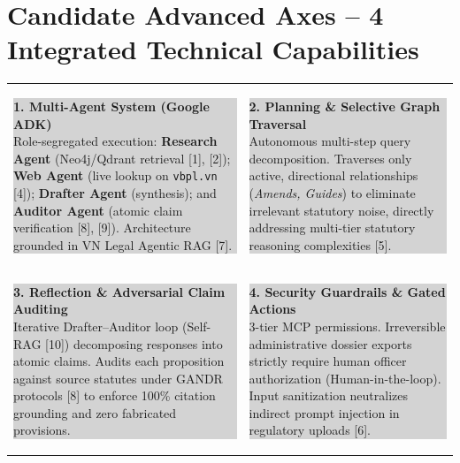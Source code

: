 \documentclass[10pt,a4paper]{article}
\begin{document}
\section{Candidate Advanced Axes -- 4 Integrated Technical Capabilities}
\vspace{-1.5pt}
\begin{tabularx}{\linewidth}{@{}X X@{}}
  \colorbox{lightgray}{\parbox{\dimexpr\linewidth-2\fboxsep}{%
    \fontsize{7.2pt}{8.4pt}\selectfont
    \textbf{\color{primary}1. Multi-Agent System (Google ADK)}\\
    Role-segregated execution: \textbf{Research Agent} (Neo4j/Qdrant retrieval [1], [2]); \textbf{Web Agent} (live lookup on \texttt{vbpl.vn} [4]); \textbf{Drafter Agent} (synthesis); and \textbf{Auditor Agent} (atomic claim verification [8], [9]). Architecture grounded in VN Legal Agentic RAG [7].
  }} & 
  \colorbox{lightgray}{\parbox{\dimexpr\linewidth-2\fboxsep}{%
    \fontsize{7.2pt}{8.4pt}\selectfont
    \textbf{\color{primary}2. Planning \& Selective Graph Traversal}\\
    Autonomous multi-step query decomposition. Traverses only active, directional relationships (\textit{Amends, Guides}) to eliminate irrelevant statutory noise, directly addressing multi-tier statutory reasoning complexities [5].
  }}\\[2.5pt]
  \colorbox{lightgray}{\parbox{\dimexpr\linewidth-2\fboxsep}{%
    \fontsize{7.2pt}{8.4pt}\selectfont
    \textbf{\color{primary}3. Reflection \& Adversarial Claim Auditing}\\
    Iterative Drafter--Auditor loop (Self-RAG [10]) decomposing responses into atomic claims. Audits each proposition against source statutes under GANDR protocols [8] to enforce 100\% citation grounding and zero fabricated provisions.
  }} & 
  \colorbox{lightgray}{\parbox{\dimexpr\linewidth-2\fboxsep}{%
    \fontsize{7.2pt}{8.4pt}\selectfont
    \textbf{\color{primary}4. Security Guardrails \& Gated Actions}\\
    3-tier MCP permissions. Irreversible administrative dossier exports strictly require human officer authorization (Human-in-the-loop). Input sanitization neutralizes indirect prompt injection in regulatory uploads [6].
  }}
\end{tabularx}
\vspace{-2pt}

\end{document}
